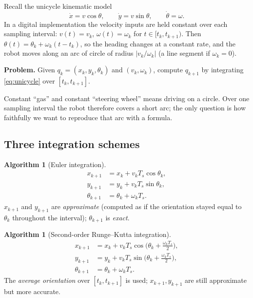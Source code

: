 \documentclass[11pt,a4paper]{article}
\def\boldsymbol#1{#1}%
\newcommand{\Ts}{T_s}
\newcommand{\bq}{\boldsymbol{q}}
\theoremstyle{definition}
\newtheorem{algorithm}[definition]{Algorithm}
\theoremstyle{plain}
\theoremstyle{remark}
\begin{document}
Recall the unicycle kinematic model
\begin{equation}\label{eq:unicycle}
\dot x = v\cos\theta,\qquad \dot y = v\sin\theta,\qquad \dot\theta=\omega .
\end{equation}
In a digital implementation the velocity inputs are held constant over each sampling interval:
$v(t)=v_k$, $\omega(t)=\omega_k$ for $t\in[t_k,t_{k+1})$. Then $\theta(t)=\theta_k+\omega_k(t-t_k)$,
so the heading changes at a constant rate, and the robot moves along an arc of circle of radius
$|v_k/\omega_k|$ (a line segment if $\omega_k=0$).

\medskip
\noindent\textbf{Problem.} Given $\bq_k=(x_k,y_k,\theta_k)$ and $(v_k,\omega_k)$, compute $\bq_{k+1}$
by integrating \eqref{eq:unicycle} over $[t_k,t_{k+1}]$.

\begin{intuition}
Constant ``gas'' and constant ``steering wheel'' means driving on a circle. Over one sampling
interval the robot therefore covers a short arc; the only question is how faithfully we want to
reproduce that arc with a formula.
\end{intuition}

\subsection{Three integration schemes}

\begin{algorithm}[Euler integration]\label{alg:euler}
\begin{align}
x_{k+1}&=x_k+v_k\Ts\cos\theta_k,\nonumber\\
y_{k+1}&=y_k+v_k\Ts\sin\theta_k,\label{eq:euler}\\
\theta_{k+1}&=\theta_k+\omega_k\Ts .\nonumber
\end{align}
$x_{k+1}$ and $y_{k+1}$ are \emph{approximate} (computed as if the orientation stayed equal to
$\theta_k$ throughout the interval); $\theta_{k+1}$ is \emph{exact}.
\end{algorithm}

\begin{algorithm}[Second-order Runge--Kutta integration]\label{alg:rk}
\begin{align}
x_{k+1}&=x_k+v_k\Ts\cos\!\Big(\theta_k+\frac{\omega_k\Ts}{2}\Big),\nonumber\\
y_{k+1}&=y_k+v_k\Ts\sin\!\Big(\theta_k+\frac{\omega_k\Ts}{2}\Big),\label{eq:rk}\\
\theta_{k+1}&=\theta_k+\omega_k\Ts .\nonumber
\end{align}
The \emph{average orientation} over $[t_k,t_{k+1}]$ is used; $x_{k+1},y_{k+1}$ are still
approximate but more accurate.
\end{algorithm}
\end{document}
